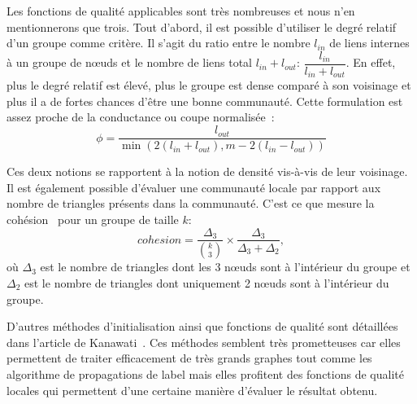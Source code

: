 Les fonctions de qualité applicables sont très nombreuses et nous n'en mentionnerons que trois.
Tout d'abord, il est possible d'utiliser le degré relatif~\cite{Luo2008} d'un groupe comme critère.
Il s'agit du ratio entre le nombre $l_{in}$ de liens internes à un groupe de n\oe{}uds et le nombre de liens total $l_{in}+l_{out}$: $ \dfrac{l_{in}}{l_{in}+l_{out}}$.
En effet, plus le degré relatif est élevé, plus le groupe est dense comparé à son voisinage et plus il a de fortes chances d'être une bonne communauté. 
Cette formulation est assez proche de la conductance ou coupe normalisée~\cite{Shi2000}:
\begin{equation}
\phi =\dfrac{l_{out}}{\min \left( 2(l_{in}+l_{out}),m-2(l_{in}-l_{out}) \right) }
\end{equation}

Ces deux notions se rapportent à la notion de densité vis-à-vis de leur voisinage.
Il est également possible d'évaluer une communauté locale par rapport aux nombre de triangles présents dans la communauté.
C'est ce que mesure la cohésion~\cite{Friggeri2011} pour un groupe de taille $k$: 
\begin{equation}
cohesion=\dfrac{\Delta_3}{ {k \choose 3} } \times \frac{\Delta_3}{\Delta_3+\Delta_2},
\end{equation}
où $\Delta_3$ est le nombre de triangles dont les 3 n\oe{}uds sont à l'intérieur du groupe et $\Delta_2$ est le nombre de triangles dont uniquement 2 n\oe{}uds sont à l'intérieur du groupe.

D'autres méthodes d'initialisation ainsi que fonctions de qualité sont détaillées dans l'article de Kanawati~\cite{Kanawati2014}.
Ces méthodes semblent très prometteuses car elles permettent de traiter efficacement de très grands graphes tout comme les algorithme de propagations de label mais elles profitent des fonctions de qualité locales qui permettent d'une certaine manière d'évaluer le résultat obtenu.





